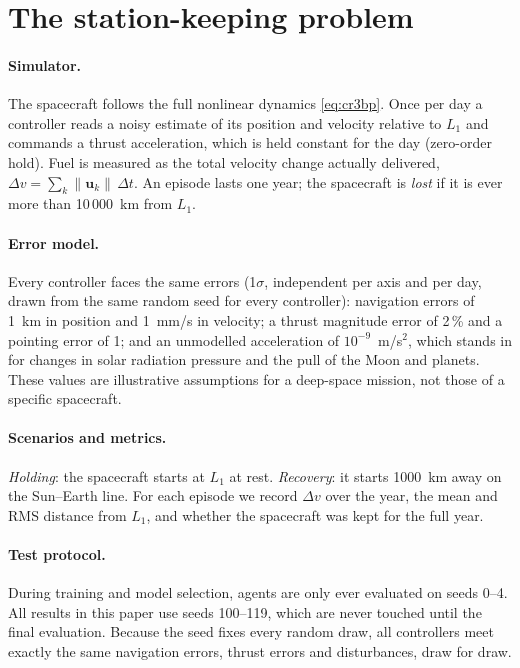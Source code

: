 \documentclass[11pt,a4paper]{article}
\newcommand{\dv}{\Delta v}
\begin{document}
\section{The station-keeping problem}
\label{sec:problem}

\paragraph{Simulator.}
The spacecraft follows the full nonlinear dynamics \eqref{eq:cr3bp}. Once per
day a controller reads a noisy estimate of its position and velocity relative
to $L_1$ and commands a thrust acceleration, which is held constant for the
day (zero-order hold). Fuel is measured as the total velocity change actually
delivered, $\dv = \sum_k \lVert \mathbf{u}_k \rVert \, \Delta t$. An episode
lasts one year; the spacecraft is \emph{lost} if it is ever more than
10\,000~km from $L_1$.

\paragraph{Error model.}
\label{sec:errors}
Every controller faces the same errors (1$\sigma$, independent per axis and per
day, drawn from the same random seed for every controller): navigation errors of
1~km in position and 1~mm/s in velocity; a thrust magnitude error of 2\,\% and
a pointing error of 1\textdegree; and an unmodelled acceleration of
$10^{-9}$~m/s$^2$, which stands in for changes in solar radiation pressure and
the pull of the Moon and planets. These values are illustrative assumptions for
a deep-space mission, not those of a specific spacecraft.

\paragraph{Scenarios and metrics.}
\emph{Holding}: the spacecraft starts at $L_1$ at rest.
\emph{Recovery}: it starts 1000~km away on the Sun--Earth line. For each
episode we record $\dv$ over the year, the mean and RMS distance from $L_1$,
and whether the spacecraft was kept for the full year.

\paragraph{Test protocol.}
During training and model selection, agents are only ever evaluated on seeds
0--4. All results in this paper use seeds 100--119, which are never touched
until the final evaluation. Because the seed fixes every random draw, all
controllers meet exactly the same navigation errors, thrust errors and
disturbances, draw for draw.
\end{document}
